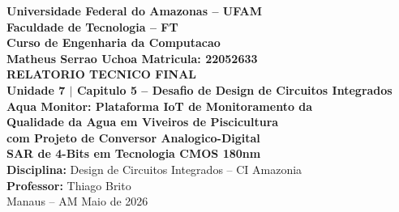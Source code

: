 \documentclass[12pt, a4paper]{article}
\begin{document}
\begin{titlepage}
\begin{center}
  {\Large\bfseries Universidade Federal do Amazonas -- UFAM}\\[0.2cm]
  {\large\bfseries Faculdade de Tecnologia -- FT}\\[0.1cm]
  {\large\bfseries Curso de Engenharia da Computacao}\\[1.8cm]

  {\large\bfseries Matheus Serrao Uchoa \quad Matricula: 22052633}\\[1.8cm]

  {\LARGE\bfseries RELATORIO TECNICO FINAL\\[0.3cm]
   Unidade 7 $|$ Capitulo 5 -- Desafio de Design de Circuitos Integrados}\\[0.7cm]

  {\Large\bfseries Aqua Monitor: Plataforma IoT de Monitoramento da\\
   Qualidade da Agua em Viveiros de Piscicultura\\[0.4cm]
   com Projeto de Conversor Analogico-Digital\\
   SAR de 4-Bits em Tecnologia CMOS 180nm}\\[1.4cm]

  \vfill
  {\normalsize\textbf{Disciplina:} Design de Circuitos Integrados -- CI Amazonia}\\[0.1cm]
  {\normalsize\textbf{Professor:} Thiago Brito}\\[0.3cm]
  {\normalsize Manaus -- AM \quad Maio de 2026}
\end{center}
\end{titlepage}

\setcounter{page}{1}
\tableofcontents
\newpage
\end{document}
